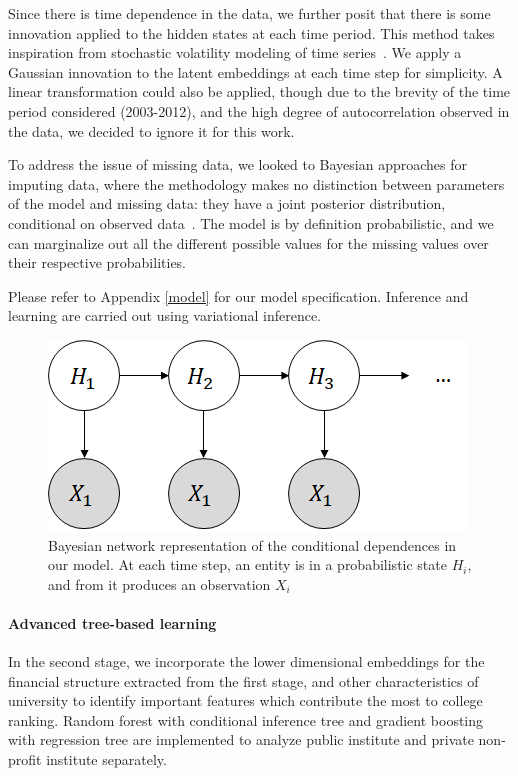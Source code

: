\documentclass[11pt,letter]{article}
\begin{document}
Since there is time dependence in the data, we further posit that there is some innovation applied to the hidden states at each time period. This method takes inspiration from stochastic volatility modeling of time series~\cite{rwbnn}. We apply a Gaussian innovation to the latent embeddings at each time step for simplicity. A linear transformation could also be applied, though due to the brevity of the time period considered (2003-2012), and the high degree of autocorrelation observed in the data, we decided to ignore it for this work. 

To address the issue of missing data, we looked to Bayesian approaches for imputing data, where the methodology makes no distinction between parameters of the model and missing data: they have a joint posterior distribution, conditional on observed data~\cite{bda3}. The model is by definition probabilistic, and we can marginalize out all the different possible values for the missing values over their respective probabilities. 

Please refer to Appendix \ref{model} for our model specification. Inference and learning are carried out using variational inference. 

\begin{figure}
\centering
\includegraphics[scale=0.6]{model_diag}
\caption{Bayesian network representation of the conditional dependences in our model. At each time step, an entity is in a probabilistic state $H_i$, and from it produces an observation $X_i$}
\end{figure}


\paragraph{Advanced tree-based learning}
In the second stage, we incorporate the lower dimensional embeddings for the financial structure extracted from the first stage, and other characteristics of university to identify important features which contribute the most to college ranking. Random forest with conditional inference tree and gradient boosting with regression tree \cite{friedman2001elements} are implemented to analyze public institute and private non-profit institute separately.          
\end{document}
